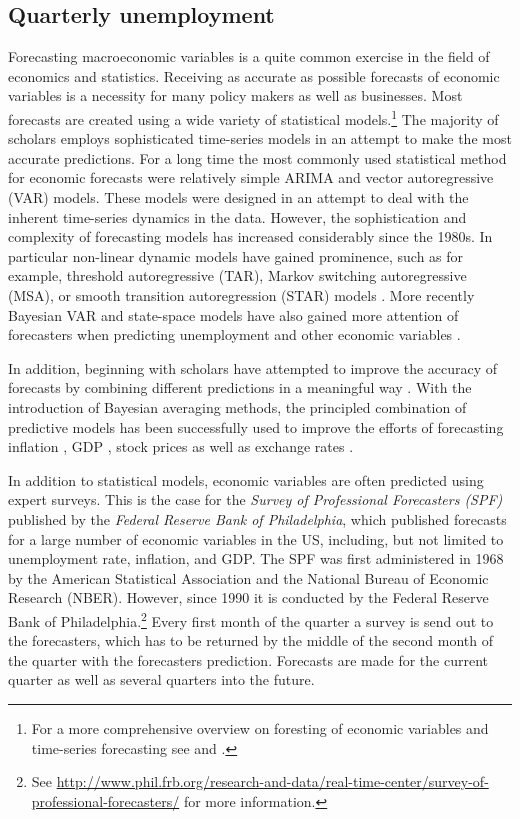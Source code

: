 \documentclass[12pt,fullpage,endnotes]{article}
\begin{document}
\subsection{Quarterly unemployment}\label{econ}
Forecasting macroeconomic variables is a quite common exercise in the field of economics and statistics. Receiving as accurate as possible forecasts of economic variables is a necessity for many policy makers as well as businesses. Most forecasts are created using a wide variety of statistical models.\footnote{For a more comprehensive overview on foresting of economic variables and time-series forecasting see \citet{Elliott:Timmermann:2008} and \citet{Goijer:Hyndman:2006}.} 
The majority of scholars employs sophisticated time-series models in an attempt to make the most accurate predictions. For a long time the most commonly used statistical method for economic forecasts were relatively simple ARIMA and vector autoregressive (VAR) models. These models were designed in an attempt to deal with the inherent time-series dynamics in the data. However, the sophistication and complexity of forecasting models has increased considerably since the 1980s. In particular non-linear dynamic models have gained prominence, such as for example, threshold autoregressive (TAR), Markov switching autoregressive (MSA), or smooth transition autoregression (STAR) models \citep{Elliott:Timmermann:2008,Montgomery:etal:1998}. More recently Bayesian VAR and state-space models have  also gained more attention of forecasters when predicting unemployment and other economic variables \citep{Goijer:Hyndman:2006,Elliott:Timmermann:2008}. 

In addition, beginning with \citet{Bates:1969} scholars have attempted to improve the accuracy of forecasts by combining different predictions in a meaningful way \citep{Palm:Zellner:1992,Elliott:Timmermann:2008}.  With the introduction of Bayesian averaging methods, the principled combination of predictive models has been successfully used to improve the efforts of forecasting          inflation \citep{Koop:2010,Wright:2009}, GDP \citep{Billio:2010}, stock prices \citep{Billio:2011} as well as exchange rates \citep{Wright:2008}.  

In addition to statistical models, economic variables are often predicted using expert surveys. This is the case for the \textit{Survey of Professional Forecasters (SPF)} published by the \textit{Federal Reserve Bank of Philadelphia}, which published forecasts for a large number of economic variables in the US, including, but not limited to unemployment rate, inflation, and GDP. The SPF was first administered in 1968 by the American Statistical Association and the National Bureau of Economic Research (NBER). However, since 1990 it is conducted by the Federal Reserve Bank of Philadelphia.\footnote{See \url{http://www.phil.frb.org/research-and-data/real-time-center/survey-of-professional-forecasters/} for more information.} Every first month of the quarter a survey is send out to the forecasters, which has to be returned by the middle of the second month of the quarter with the forecasters prediction. Forecasts are made for the current quarter as well as several quarters into the future. 
\end{document}

